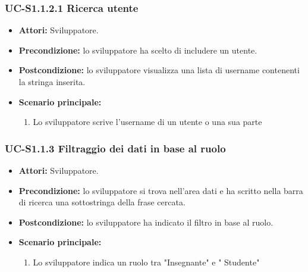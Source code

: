 	\subsubsection{UC-S1.1.2.1 Ricerca utente}
		\begin{itemize}
			\item \textbf{Attori:} Sviluppatore.
			\item \textbf{Precondizione:} lo sviluppatore ha scelto di includere un utente.
			\item \textbf{Postcondizione:} lo sviluppatore visualizza una lista di username contenenti la stringa inserita.
			\item \textbf{Scenario principale:}
			\begin{enumerate}
				\item Lo sviluppatore scrive l'username di un utente o una sua parte
			\end{enumerate}
		\end{itemize}		
			
	\subsubsection{UC-S1.1.3 Filtraggio dei dati in base al ruolo}	
		\begin{itemize}
			\item \textbf{Attori:} Sviluppatore.
			\item \textbf{Precondizione:} lo sviluppatore si trova nell'area dati e ha scritto nella barra di ricerca una sottostringa della frase cercata.
			\item \textbf{Postcondizione:} lo sviluppatore ha indicato il filtro in base al ruolo.
			\item \textbf{Scenario principale:}
				\begin{enumerate}
					\item Lo sviluppatore indica un ruolo tra "Insegnante" e " Studente"
				\end{enumerate}
		\end{itemize}

